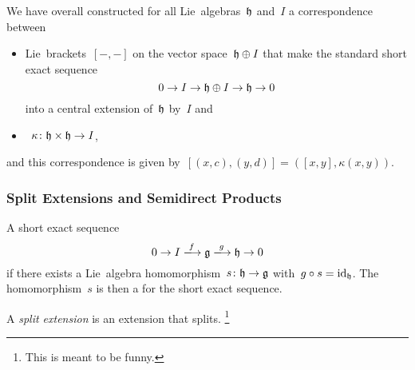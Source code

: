 \begin{example}
  We have overall constructed for all Lie~algebras~$\mathfrak{h}$ and~$I$ a {\onetoone} correspondence between
  \begin{itemize}
    \item
      Lie~brackets~$[-,-]$ on the vector space~$\mathfrak{h} \oplus I$ that make the standard short exact sequence
      \[
        0
        \to
        I
        \to
        \mathfrak{h}
        \oplus
        I
        \to
        \mathfrak{h}
        \to
        0
      \]
      into a central extension of~$\mathfrak{h}$ by~$I$ and
    \item
      {\twococycles}~$\kappa \colon \mathfrak{h} \times \mathfrak{h} \to I$,
  \end{itemize}
  and this correspondence is given by~$[(x,c), (y,d)] = ([x,y], \kappa(x,y))$.
\end{example}



\subsubsection{Split Extensions and Semidirect Products}


\begin{definition}
  A short exact sequence
  \[
    0
    \to
    I
    \xlongto{f}
    \glie
    \xlongto{g}
    \hlie
    \to
    0
  \]
   if there exists a Lie~algebra homomorphism~$s \colon \mathfrak{h} \to \mathfrak{g}$ with~$g \circ s = \operatorname{id}_{\mathfrak{h}}$.
  The homomorphism~$s$ is then a  for the short exact sequence.
  
  A \emph{split extension} is an extension that splits.%
  \footnote{This is meant to be funny.}
\end{definition}


